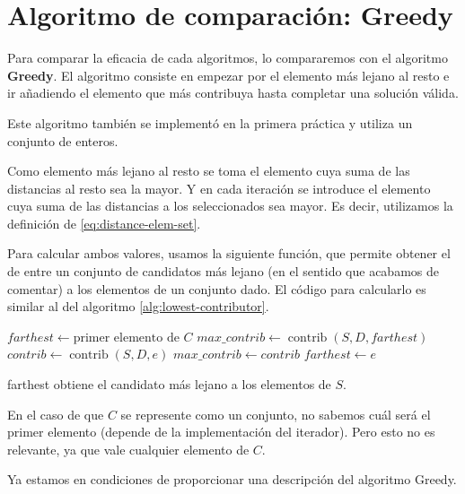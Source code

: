 \documentclass{article}
\begin{document}
\pagebreak

\section{Algoritmo de comparación: Greedy}

Para comparar la eficacia de cada algoritmos, lo compararemos con el algoritmo \textbf{Greedy}. El algoritmo consiste en empezar por el
elemento más lejano al resto e ir añadiendo el elemento que más contribuya hasta completar una solución válida.

Este algoritmo también se implementó en la primera práctica y utiliza un conjunto de enteros.

Como elemento más lejano al resto se toma el elemento cuya suma de las distancias al resto sea la mayor. Y en cada iteración se introduce el elemento
cuya suma de las distancias a los seleccionados sea mayor. Es decir, utilizamos la definición de \eqref{eq:distance-elem-set}.

Para calcular ambos valores, usamos la siguiente función, que permite obtener el de entre
un conjunto de candidatos más lejano (en el sentido que acabamos de comentar) a los elementos de un conjunto dado.
El código para calcularlo es similar al del algoritmo \ref{alg:lowest-contributor}.

\begin{algorithm}[H]
	\DontPrintSemicolon %
	$farthest \gets \text{primer elemento de } C$\;
	$max\_contrib \gets \operatorname{contrib}(S,D,farthest)$\;
	 {
		$contrib \gets \operatorname{contrib}(S,D,e)$\;
		 { 
			$max\_contrib \gets contrib$\;
			$farthest \gets e$ 
		}
	}
	\;
	\caption{{\sc farthest} obtiene el candidato más lejano a los elementos de $S$.}
	\label{alg:farthest-candidate-set}
\end{algorithm}

En el caso de que $C$ se represente como un conjunto, no sabemos cuál será el primer elemento (depende de la implementación del iterador). Pero
esto no es relevante, ya que vale cualquier elemento de $C$.

Ya estamos en condiciones de proporcionar una descripción del algoritmo Greedy.
\end{document}
